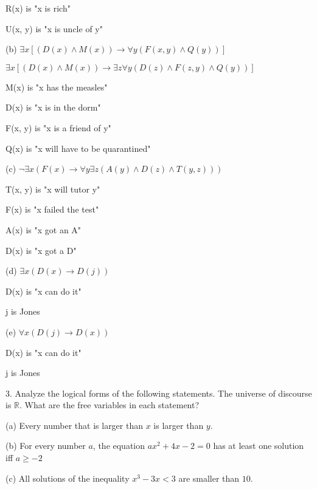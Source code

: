 \documentclass{article}
\begin{document}
R(x) is "x is rich"

U(x, y) is "x is uncle of y"

\vspace{20pt}

(b) $\exists x [(D(x) \land M(x)) \to \forall y (F(x, y) \land Q(y))]$

$\exists x [(D(x) \land M(x)) \to \exists z \forall y (D(z) \land F(z, y) \land Q(y))]$

M(x) is "x has the measles"

D(x) is "x is in the dorm"

F(x, y) is "x is a friend of y"

Q(x) is "x will have to be quarantined"

\vspace{20pt}

(c) $\neg \exists x (F(x) \to \forall y \exists z(A(y) \land D(z) \land T(y, z)))$

T(x, y) is "x will tutor y"

F(x) is "x failed the test"

A(x) is "x got an A"

D(x) is "x got a D"

\vspace{20pt}

(d) $\exists x (D(x) \to D(j))$

D(x) is "x can do it"

j is Jones

\vspace{20pt}

(e) $\forall x (D(j) \to D(x))$

D(x) is "x can do it"

j is Jones

\vspace{30pt}

3. Analyze the logical forms of the following statements. The universe of
discourse is $\mathbb{R}$. What are the free variables in each statement?

\hspace{12pt}(a) Every number that is larger than $x$ is larger than $y$.

\hspace{12pt}(b) For every number $a$, the equation $ax^2 + 4x - 2 = 0$ has at least one
solution iff $a \geq −2$

\hspace{12pt}(c) All solutions of the inequality $x^3 - 3x < 3$ are smaller than $10$.
\end{document}
